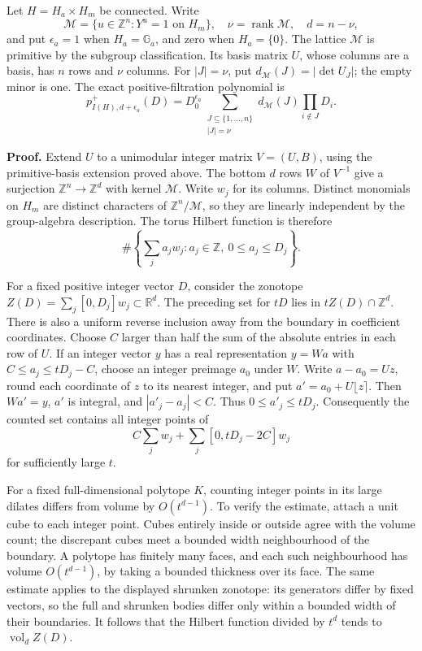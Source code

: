 \documentclass[
  11pt,
  a4paper,
]{article}
\begin{document}
Let \(H=H_a\times H_m\) be connected. Write \[
\mathcal M=\{u\in\mathbb Z^n:Y^u=1\text{ on }H_m\},
\quad \nu=\operatorname{rank}\mathcal M,\quad d=n-\nu,
\] and put \(\epsilon_a=1\) when \(H_a=\mathbb G_a\), and zero when
\(H_a=\{0\}\). The lattice \(\mathcal M\) is primitive by the subgroup
classification. Its basis matrix \(U\), whose columns are a basis, has
\(n\) rows and \(\nu\) columns. For \(|J|=\nu\), put
\(d_{\mathcal M}(J)=|\det U_J|\); the empty minor is one. The exact
positive-filtration polynomial is \[
p_{I(H),d+\epsilon_a}^+(D)=
D_0^{\epsilon_a}
\sum_{\substack{J\subseteq\{1,\ldots,n\}\\|J|=\nu}}
d_{\mathcal M}(J)\prod_{i\notin J}D_i.
\tag{8.74}
\]

\textbf{Proof.} Extend \(U\) to a unimodular integer matrix \(V=(U,B)\),
using the primitive-basis extension proved above. The bottom \(d\) rows
\(W\) of \(V^{-1}\) give a surjection \(\mathbb Z^n\to\mathbb Z^d\) with
kernel \(\mathcal M\). Write \(w_j\) for its columns. Distinct monomials
on \(H_m\) are distinct characters of \(\mathbb Z^n/\mathcal M\), so
they are linearly independent by the group-algebra description. The
torus Hilbert function is therefore \[
\#\left\{\sum_j a_jw_j: a_j\in\mathbb Z,\ 0\le a_j\le D_j\right\}.
\]

For a fixed positive integer vector \(D\), consider the zonotope
\(Z(D)=\sum_j[0,D_j]w_j\subset\mathbb R^d\). The preceding set for
\(tD\) lies in \(tZ(D)\cap\mathbb Z^d\). There is also a uniform reverse
inclusion away from the boundary in coefficient coordinates. Choose
\(C\) larger than half the sum of the absolute entries in each row of
\(U\). If an integer vector \(y\) has a real representation \(y=Wa\)
with \(C\le a_j\le tD_j-C\), choose an integer preimage \(a_0\) under
\(W\). Write \(a-a_0=Uz\), round each coordinate of \(z\) to its nearest
integer, and put \(a'=a_0+U\lfloor z\rceil\). Then \(Wa'=y\), \(a'\) is
integral, and \(|a'_j-a_j|<C\). Thus \(0\le a'_j\le tD_j\). Consequently
the counted set contains all integer points of \[
C\sum_jw_j+\sum_j[0,tD_j-2C]w_j
\] for sufficiently large \(t\).

For a fixed full-dimensional polytope \(K\), counting integer points in
its large dilates differs from volume by \(O(t^{d-1})\). To verify the
estimate, attach a unit cube to each integer point. Cubes entirely
inside or outside agree with the volume count; the discrepant cubes meet
a bounded width neighbourhood of the boundary. A polytope has finitely
many faces, and each such neighbourhood has volume \(O(t^{d-1})\), by
taking a bounded thickness over its face. The same estimate applies to
the displayed shrunken zonotope: its generators differ by fixed vectors,
so the full and shrunken bodies differ only within a bounded width of
their boundaries. It follows that the Hilbert function divided by
\(t^d\) tends to \(\operatorname{vol}_d Z(D)\).
\end{document}
